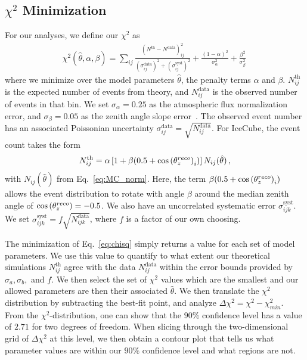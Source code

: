 \subsection{\texorpdfstring{$\chi^2$}{Chi-squared} Minimization}
For our analyses, we define our $\chi^2$ as
\begin{align} \label{eq:chisq}
    \chi^{2}(\hat{\theta},\alpha,\beta)=\sum_{ij} \frac{\left(N^\text{th}-N^\text{data}\right)_{ij}^{2}}
    {\left(\sigma^\text{data}_{ij}\right)^{2} + \left(\sigma^\text{syst}_{ij}\right)^{2}}+ 
    \frac{(1-\alpha)^2}{\sigma_\alpha^2} + \frac{\beta^2}{\sigma_\beta^2}\,
\end{align}
where we minimize over the model parameters $\hat{\theta}$, the penalty terms $\alpha$ and $\beta$.
$N_{ij}^\text{th}$ is the expected number of events from theory, and $N_{ij}^\text{data}$ is the observed number of events in that bin. 
We set $\sigma_\alpha = 0.25$ as the atmospheric flux normalization error, and $\sigma_\beta = 0.05$ as the zenith angle slope error~\cite{hondapaper}. 
The observed event number has an associated Poissonian uncertainty $\sigma_{ij}^\text{data} = \sqrt{N_{ij}^\text{data}}$.
For IceCube, the event count takes the form
\begin{align}
    N^\text{th}_{ij} = \alpha\left[1+\beta (0.5 + \cos{(\theta_z^{reco})}_i )\right] N_{ij}(\hat{\theta})\,,
\end{align}
with $N_{ij}(\hat{\theta})$ from Eq.~\ref{eq:MC_norm}. Here, the term $ \beta (0.5 + \cos{(\theta_z^{reco})}_i )$ allows the event distribution to rotate with angle $\beta$ around the median zenith angle of $\cos{(\theta_z^{reco})} = -0.5$.
We also have an uncorrelated systematic error $\sigma_{ijk}^\text{syst}$. We set $\sigma_{ijk}^\text{syst} = f\sqrt{N_{ijk}^\text{data}}$, where $f$ is a factor of our own choosing.

The minimization of Eq.~\ref{eq:chisq} simply returns a value for each set of model parameters. We use this value to quantify to what extent
our theoretical simulations $N^\text{th}_{ij}$ agree with the data $N^\text{data}_{ij}$ within the error bounds provided by $\sigma_a,\sigma_b,$ and $f$.
We then select the set of $\chi^2$ values which are the smallest and our allowed parameters are then their associated $\hat{\theta}$.
We then translate the $\chi^2$ distribution by subtracting the best-fit point, and analyze $\Delta \chi^2 = \chi^2 - \chi^2_{min}$.
From the $\chi^2$-distribution, one can show that the $90\%$ confidence level has a value of $2.71$ for two degrees of freedom. When slicing through the 
two-dimensional grid of $\Delta \chi^2$ at this level, we then obtain a contour plot that tells us what parameter values are within our $90 \%$ confidence level and what regions are not.

